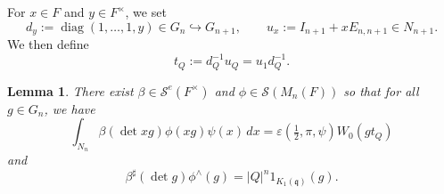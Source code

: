\documentclass[reqno]{amsart}
\theoremstyle{plain}
\newtheorem{lemma}[theorem]{Lemma}
\theoremstyle{definition}
\begin{document}
For $x \in F$ and $y \in F^\times$, we set
\begin{equation*}
  d_y:=\operatorname{diag}(1,\dotsc,1,y)\in G_n \hookrightarrow G_{n + 1},
  \qquad
  u_x:=I_{n+1}+ x E_{n,n+1} \in N_{n + 1}.
\end{equation*}
We then define
\begin{equation*}
  t_Q:= d_Q^{-1} u_Q = u_1 d_Q^{-1}.
\end{equation*}
\begin{lemma}\label{proposition:cq4jqgh7yi}
  There exist $\beta \in \mathcal{S}^e(F^\times)$ and $\phi \in \mathcal{S}(M_n(F))$ so that for all $g \in G_n$, we have
  \begin{equation}\label{eq:cq4jqjeuyf}
    \int_{N_n} \beta(\det x g) \phi(x g) \psi(x) \, d x = \varepsilon(\tfrac{1}{2}, \pi, \psi) W_0(g t_{Q})
  \end{equation}
  and
  \begin{equation}\label{eq:cq4jqjy05j}
    \beta^\sharp(\det g) \phi^\wedge(g) = \lvert Q \rvert^n 1_{K_1(\mathfrak{q})}(g).
  \end{equation}
\end{lemma}
\end{document}
